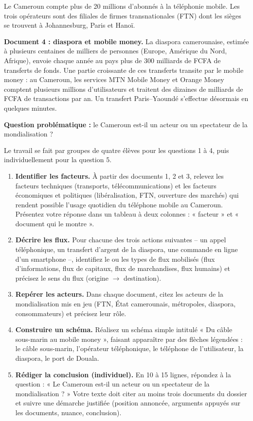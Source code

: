 \documentclass[11pt]{article}
\newcounter{popsec}
\newcounter{popsub}
\newcommand{\courssub}[1]{%
  \stepcounter{popsub}%
  \par\vspace{9pt}\noindent{\popxbold\fontsize{11.5}{13}\selectfont\color{popink}{\color{poporange}\thepopsec.\thepopsub}\hspace{6pt}#1}\par\nopagebreak\vspace{4pt}
}
\begin{document}
Le Cameroun compte plus de 20 millions d'abonnés à la téléphonie mobile. Les trois opérateurs sont des filiales de firmes transnationales (FTN) dont les sièges se trouvent à Johannesburg, Paris et Hanoï.

\textbf{Document 4 : diaspora et mobile money.} La diaspora camerounaise, estimée à plusieurs centaines de milliers de personnes (Europe, Amérique du Nord, Afrique), envoie chaque année au pays plus de 300 milliards de FCFA de transferts de fonds. Une partie croissante de ces transferts transite par le mobile money : au Cameroun, les services MTN Mobile Money et Orange Money comptent plusieurs millions d'utilisateurs et traitent des dizaines de milliards de FCFA de transactions par an. Un transfert Paris--Yaoundé s'effectue désormais en quelques minutes.

\textbf{Question problématique :} le Cameroun est-il un acteur ou un spectateur de la mondialisation ?

\courssub{Consignes}

Le travail se fait par groupes de quatre élèves pour les questions 1 à 4, puis individuellement pour la question 5.

\begin{enumerate}
\item \textbf{Identifier les facteurs.} À partir des documents 1, 2 et 3, relevez les facteurs techniques (transports, télécommunications) et les facteurs économiques et politiques (libéralisation, FTN, ouverture des marchés) qui rendent possible l'usage quotidien du téléphone mobile au Cameroun. Présentez votre réponse dans un tableau à deux colonnes : « facteur » et « document qui le montre ».
\item \textbf{Décrire les flux.} Pour chacune des trois actions suivantes -- un appel téléphonique, un transfert d'argent de la diaspora, une commande en ligne d'un smartphone --, identifiez le ou les types de flux mobilisés (flux d'informations, flux de capitaux, flux de marchandises, flux humains) et précisez le sens du flux (origine $\rightarrow$ destination).
\item \textbf{Repérer les acteurs.} Dans chaque document, citez les acteurs de la mondialisation mis en jeu (FTN, État camerounais, métropoles, diaspora, consommateurs) et précisez leur rôle.
\item \textbf{Construire un schéma.} Réalisez un schéma simple intitulé « Du câble sous-marin au mobile money », faisant apparaître par des flèches légendées : le câble sous-marin, l'opérateur téléphonique, le téléphone de l'utilisateur, la diaspora, le port de Douala.
\item \textbf{Rédiger la conclusion (individuel).} En 10 à 15 lignes, répondez à la question : « Le Cameroun est-il un acteur ou un spectateur de la mondialisation ? » Votre texte doit citer au moins trois documents du dossier et suivre une démarche justifiée (position annoncée, arguments appuyés sur les documents, nuance, conclusion).
\end{enumerate}
\end{document}
